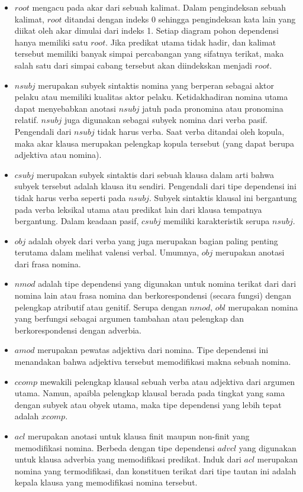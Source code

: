 \begin{itemize}
\item $root$ mengacu pada akar dari sebuah kalimat. Dalam pengindeksan sebuah kalimat, $root$ ditandai dengan indeks 0 sehingga pengindeksan kata lain yang diikat oleh akar dimulai dari indeks 1. Setiap diagram pohon dependensi hanya memiliki satu $root$. Jika predikat utama tidak hadir, dan kalimat tersebut memiliki banyak simpai percabangan yang sifatnya terikat, maka salah satu dari simpai cabang tersebut akan diindekskan menjadi $root$.
\item $nsubj$ merupakan subyek sintaktis nomina yang berperan sebagai aktor pelaku atau memiliki kualitas aktor pelaku. Ketidakhadiran nomina utama dapat menyebabkan anotasi $nsubj$ jatuh pada pronomina atau pronomina relatif. $nsubj$ juga digunakan sebagai subyek nomina dari verba pasif. Pengendali dari $nsubj$ tidak harus verba. Saat verba ditandai oleh kopula, maka akar klausa merupakan pelengkap kopula tersebut (yang dapat berupa adjektiva atau nomina).
\item $csubj$ merupakan subyek sintaktis dari sebuah klausa dalam arti bahwa subyek tersebut adalah klausa itu sendiri. Pengendali dari tipe dependensi ini tidak harus verba seperti pada $nsubj$. Subyek sintaktis klausal ini bergantung pada verba leksikal utama atau predikat lain dari klausa tempatnya bergantung. Dalam keadaan pasif, $csubj$ memiliki karakteristik serupa $nsubj$.
\item $obj$ adalah obyek dari verba yang juga merupakan bagian paling penting terutama dalam melihat valensi verbal. Umumnya, $obj$ merupakan anotasi dari frasa nomina.
\item $nmod$ adalah tipe dependensi yang digunakan untuk nomina terikat dari dari nomina lain atau frasa nomina dan berkorespondensi (secara fungsi) dengan pelengkap atributif atau genitif. Serupa dengan $nmod$, $obl$ merupakan nomina yang berfungsi sebagai argumen tambahan atau pelengkap dan berkorespondensi dengan adverbia.
\item $amod$ merupakan pewatas adjektiva dari nomina. Tipe dependensi ini menandakan bahwa adjektiva tersebut memodifikasi makna sebuah nomina.
\item $ccomp$ mewakili pelengkap klausal sebuah verba atau adjektiva dari argumen utama. Namun, apaibla pelengkap klausal berada pada tingkat yang sama dengan subyek atau obyek utama, maka tipe dependensi yang lebih tepat adalah $xcomp$.
\item $acl$ merupakan anotasi untuk klausa finit maupun non-finit yang memodifikasi nomina. Berbeda dengan tipe dependensi $advcl$ yang digunakan untuk klausa adverbia yang memodifikasi predikat. Induk dari $acl$ merupakan nomina yang termodifikasi, dan konstituen terikat dari tipe tautan ini adalah kepala klausa yang memodifikasi nomina tersebut.

\end{itemize}
